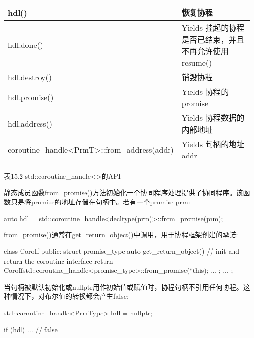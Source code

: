 \begin{longtable}[c]{|l|l|}
hdl()                                                                                  & 恢复协程                                                               \\ \hline
hdl.done()                                                                             & Yields 挂起的协程是否已结束，并且不再允许使用resume() \\ \hline
hdl.destroy()                                                                          & 销毁协程                                                                \\ \hline
hdl.promise()                                                                          & Yields 协程的promise                                                    \\ \hline
hdl.address()                                                                          & Yields 协程数据的内部地址                                     \\ \hline
coroutine\_handle\textless{}PrmT\textgreater{}::from\_address(addr)                    & Yields 句柄的地址addr                                             \\ \hline
\end{longtable}

\begin{center}
表15.2 std::coroutine\_handle<>的API
\end{center}

静态成员函数from\_promise()方法初始化一个协同程序处理提供了协同程序。该函数只是将promise的地址存储在句柄中。若有一个promise prm:

\begin{cpp}
auto hdl = std::coroutine_handle<decltype(prm)>::from_promise(prm);
\end{cpp}

from\_promise()通常在get\_return\_object()中调用，用于协程框架创建的承诺:

\begin{cpp}
class CoroIf {
	public:
	struct promise_type {
		auto get_return_object() { // init and return the coroutine interface
			return CoroIf{std::coroutine_handle<promise_type>::from_promise(*this)};
		}
		...
	};
...
};
\end{cpp}

当句柄被默认初始化或nullptr用作初始值或赋值时，协程句柄不引用任何协程。这种情况下，对布尔值的转换都会产生false:

\begin{cpp}
std::coroutine_handle<PrmType> hdl = nullptr;

if (hdl) ... // false
\end{cpp}

